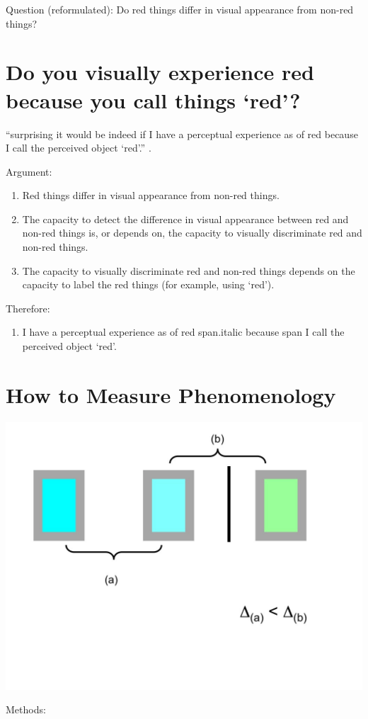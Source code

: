 \documentclass[12pt]{extarticle}
\begin{document}
\begin{multicols*}{3}
Question (reformulated):
Do red things differ in visual appearance from non-red things?




\section{Do you visually experience red because you call things ‘red’?}

“surprising it would be indeed if I have a perceptual experience as of red because I call the perceived object ‘red’.”
\citep[pp.~324--5]{Stokes:2006fd}.

Argument:
\begin{enumerate}
\item Red things differ in visual appearance from non-red things.
\item The capacity to detect the difference in visual appearance between
red and non-red things is, or depends on, the capacity to visually
discriminate red and non-red things.
\item The capacity to visually discriminate red and non-red things depends
on the capacity to label the red things (for example, using ‘red’).
\end{enumerate}
Therefore:
\begin{enumerate}[resume]
\item I have a perceptual experience as of red span.italic
because span I call the perceived object ‘red’.
\end{enumerate}



\section{How to Measure Phenomenology}

\begin{center}
\includegraphics[scale=0.25]{img/categorical_colour_difference3.jpg}
\end{center}
Methods:
\begin{enumerate}


\end{enumerate}
\end{multicols*}
\end{document}
